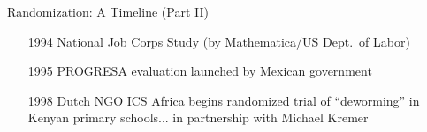 \documentclass[10pt,xcolor=table,ignorenonframetext,handout,aspectratio=169]{beamer}
\newlength{\wideitemsep}
\let\olditem\item
\renewcommand{\item}{\setlength{\itemsep}{\wideitemsep}\olditem}
\begin{document}
\begin{frame}{Randomization:  A Timeline (Part II)}
\begin{small}
\begin{itemize}
		\item[1994] National Job Corps Study (by Mathematica/US Dept.~of Labor)
		
		\item[1995] PROGRESA evaluation launched by Mexican government
		
		\item[1998] Dutch NGO ICS Africa begins randomized trial of ``deworming'' in Kenyan primary schools... in partnership with Michael Kremer
		
	\end{itemize}
\end{small}

\end{frame}


\end{document}
